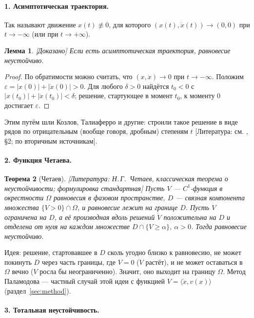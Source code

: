 \documentclass[11pt,a4paper]{article}
\newtheorem{theorem}{Теорема}[section]
\newtheorem{lemma}[theorem]{Лемма}
\theoremstyle{definition}
\newcommand{\eps}{\varepsilon}
\newcommand{\mk}[1]{\textsf{[#1]}}
\begin{document}
\paragraph{1. Асимптотическая траектория.} Так называют движение $x(t)\not\equiv0$, для
которого $(x(t),\dot x(t))\to(0,0)$ при $t\to-\infty$ (или при $t\to+\infty$).

\begin{lemma}\label{lem:asympt}
\mk{Доказано} Если есть асимптотическая траектория, равновесие неустойчиво.
\end{lemma}
\begin{proof}
По обратимости можно считать, что $(x,\dot x)\to0$ при $t\to-\infty$. Положим
$\eps=|x(0)|+|\dot x(0)|>0$. Для любого $\delta>0$ найдётся $t_0<0$ с
$|x(t_0)|+|\dot x(t_0)|<\delta$; решение, стартующее в момент $t_0$, к моменту $0$ достигает
$\eps$.
\end{proof}

Этим путём шли Козлов, Талиаферро и другие: строили такое решение в виде рядов по
отрицательным (вообще говоря, дробным) степеням $t$ \mk{Литература: см.
, §2; по вторичным источникам}.

\paragraph{2. Функция Четаева.}
\begin{theorem}[Четаев]\label{thm:chetaev}
\mk{Литература: Н.\,Г.~Четаев, классическая теорема о неустойчивости; формулировка стандартная}
Пусть $V$ --- $C^1$-функция в окрестности $\Omega$ равновесия в фазовом пространстве, $D$ ---
связная компонента множества $\{V>0\}\cap\Omega$, и равновесие лежит на границе $D$. Пусть $V$
ограничена на $D$, а её производная вдоль решений $\dot V$ положительна на $D$ и отделена от нуля
на каждом множестве $D\cap\{V\ge\alpha\}$, $\alpha>0$. Тогда равновесие неустойчиво.
\end{theorem}
Идея: решение, стартовавшее в $D$ сколь угодно близко к равновесию, не может покинуть $D$
через часть границы, где $V=0$ ($V$ растёт), и не может оставаться в $\Omega$ вечно ($V$ росла бы
неограниченно). Значит, оно выходит на границу $\Omega$. Метод Паламодова --- частный случай этой
идеи с функцией $V=\langle\dot x,v(x)\rangle$ (раздел~\ref{sec:method}).

\paragraph{3. Тотальная неустойчивость.}
\end{document}
